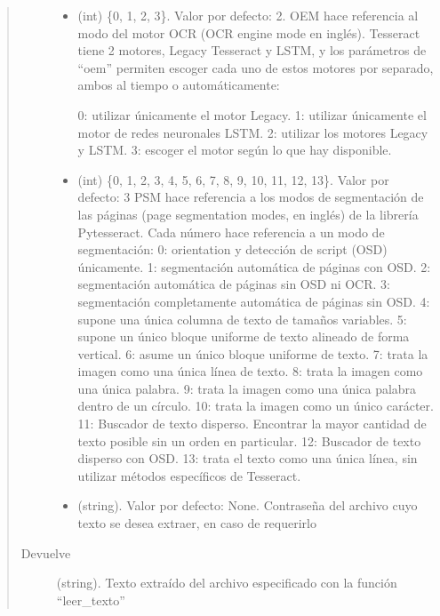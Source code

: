 \documentclass[letterpaper,10pt,openany,spanish]{sphinxmanual}
\begin{document}
\begin{fulllineitems}
\begin{quote}
\begin{description}
\begin{itemize}
\item {} 
 \textendash{} (int) \{0, 1, 2, 3\}. Valor por defecto: 2. OEM hace referencia al modo del motor OCR (OCR engine mode         en inglés). Tesseract tiene 2 motores, Legacy Tesseract y LSTM, y los parámetros de “oem”         permiten escoger cada uno de estos motores por separado, ambos al tiempo o         automáticamente: 
 
 0: utilizar únicamente el motor Legacy.  
 1: utilizar únicamente el motor de redes neuronales LSTM.  
 2: utilizar los motores Legacy y LSTM.  
 3: escoger el motor según lo que hay disponible.  


\item {} 
 \textendash{} (int) \{0, 1, 2, 3, 4, 5, 6, 7, 8, 9, 10, 11, 12, 13\}. Valor por defecto: 3 PSM hace referencia a         los modos de segmentación de las páginas (page segmentation modes, en inglés) de la         librería Pytesseract. Cada número hace referencia a un modo de segmentación:           
 0: orientation y detección de script (OSD) únicamente.  
 1: segmentación automática de páginas con OSD.  
 2: segmentación automática de páginas sin OSD ni OCR.  
 3: segmentación completamente automática de páginas sin OSD.  
 4: supone una única columna de texto de tamaños variables.  
 5: supone un único bloque uniforme de texto alineado de forma vertical.  
 6: asume un único bloque uniforme de texto.  
 7: trata la imagen como una única línea de texto.  
 8: trata la imagen como una única palabra.  
 9: trata la imagen como una única palabra dentro de un círculo.  
 10: trata la imagen como un único carácter.  
 11: Buscador de texto disperso. Encontrar la mayor cantidad de texto posible sin un orden en particular.  
 12: Buscador de texto disperso con OSD.  
 13: trata el texto como una única línea, sin utilizar métodos específicos de Tesseract.  


\item {} 
 \textendash{} (string). Valor por defecto: None. Contraseña del archivo cuyo texto se desea         extraer, en caso de requerirlo

\end{itemize}

\item[{Devuelve}] \leavevmode
(string). Texto extraído del archivo especificado con la función “leer\_texto”

\end{description}\end{quote}

\end{fulllineitems}
\end{document}
